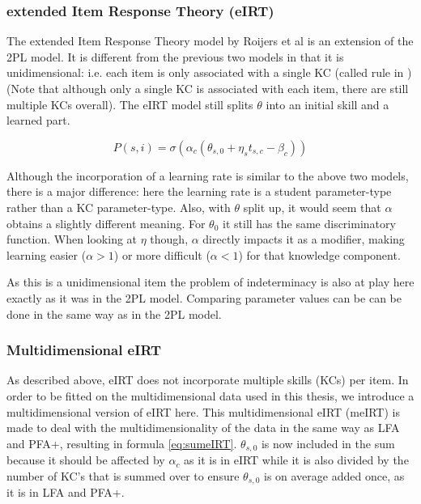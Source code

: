 \documentclass{scrartcl}
\begin{document}
\subsubsection{extended Item Response Theory (eIRT)}
\label{sec:eIRT}
The extended Item Response Theory model by Roijers et al \cite{eirt} is an extension of the 2PL model. It is different from the previous two models in that it is unidimensional: i.e. each item is only associated with a single KC (called rule in \cite{eirt}) (Note that although only a single KC is associated with each item, there are still multiple KCs overall). The eIRT model still splits $\theta$ into an initial skill and a learned part. 

\begin{equation}
\label{eq:eIRT}
P(s,i) = \sigma(\alpha_{c} (\theta_{s,0} + \eta_{s} t_{s,c} - \beta_{c}))
\end{equation}

Although the incorporation of a learning rate is similar to the above two models, there is a major difference: here the learning rate is a student parameter-type rather than a KC parameter-type. Also, with $\theta$ split up, it would seem that $\alpha$ obtains a slightly different meaning. For $\theta_{0}$ it still has the same discriminatory function. When looking at $\eta$ though, $\alpha$ directly impacts it as a modifier, making learning easier ($\alpha>1$) or more difficult ($\alpha<1$) for that knowledge component.

As this is a unidimensional item the problem of indeterminacy is also at play here exactly as it was in the 2PL model. Comparing parameter values can be can be done in the same way as in the 2PL model.

\subsubsection{Multidimensional eIRT}
As described above, eIRT does not incorporate multiple skills (KCs) per item. In order to be fitted on the multidimensional data used in this thesis, we introduce a multidimensional version of eIRT here. This multidimensional eIRT (meIRT) is made to deal with the multidimensionality of the data in the same way as LFA and PFA+, resulting in formula \ref{eq:sumeIRT}. $\theta_{s,0}$ is now included in the sum because it should be affected by $\alpha_{c}$ as it is in eIRT while it is also divided by the number of KC's that is summed over to ensure $\theta_{s,0}$ is on average added once, as it is in LFA and PFA+.
\end{document}

